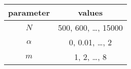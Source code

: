\begin{tabular}{cc}
  parameter & values \\
  \hline
  $N$ & 500, 600, \ldots, 15000 \\
  $\alpha$ & 0, 0.01, \ldots, 2 \\
  $m$ & 1, 2, \ldots, 8 \\
  \hline
\end{tabular}
